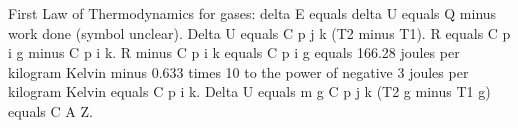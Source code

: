 First Law of Thermodynamics for gases: delta E equals delta U equals Q minus work done (symbol unclear).  
Delta U equals C p j k (T2 minus T1).  
R equals C p i g minus C p i k.  
R minus C p i k equals C p i g equals 166.28 joules per kilogram Kelvin minus 0.633 times 10 to the power of negative 3 joules per kilogram Kelvin equals C p i k.  
Delta U equals m g C p j k (T2 g minus T1 g) equals C A Z.